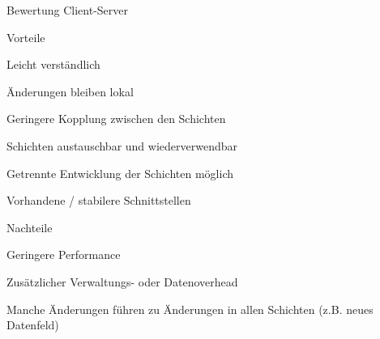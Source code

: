 \documentclass[a4paper]{article}
\begin{document}
\begin{multicols}{3}
  Bewertung Client-Server
  \begin{itemize*}
    \item Vorteile
    \begin{itemize*}
      \item Leicht verständlich
      \item Änderungen bleiben lokal
      \item Geringere Kopplung zwischen den Schichten
      \item Schichten austauschbar und wiederverwendbar
      \item Getrennte Entwicklung der Schichten möglich
      \item Vorhandene / stabilere Schnittstellen
    \end{itemize*}
    \item Nachteile
    \begin{itemize*}
      \item Geringere Performance
      \item Zusätzlicher Verwaltungs- oder Datenoverhead
      \item Manche Änderungen führen zu Änderungen in allen Schichten (z.B. neues Datenfeld)
    \end{itemize*}
  \end{itemize*}


\end{multicols}
\end{document}
